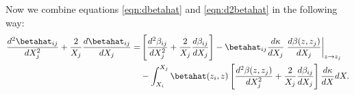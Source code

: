 Now we combine equations \ref{eqn:dbetahat} and \ref{eqn:d2betahat} in the following way:
\begin{eqnarray}
\label{eqn:betahatcombine} 
\frac{d^2 \betahat_{i j}}{d X_j^2} + \frac{2}{X_j} \frac{d \betahat_{i j}}{d X_j} = & \left[\frac{d^2 \beta_{i j}}{d X_j^2}  + \frac{2}{X_j} \frac{d \beta_{i j}}{d X_j}\right] -  \betahat_{i j} \frac{d \kappa}{d X_j} \left. \frac{d \beta(z, z_j)}{d X_j}  \right|_{z \rightarrow z_j} \nonumber \\ 
&- \int_{X_i}^{X_j} \betahat(z_i, z)\left[ \frac{d^2 \beta(z, z_j)}{d X_j^2}  + \frac{2}{X_j} \frac{d \beta_{i j}}{dX_j}\right] \frac{d \kappa}{d X} d X.
\end{eqnarray}
  
  
  
  
  
  
  
  
  
  
  